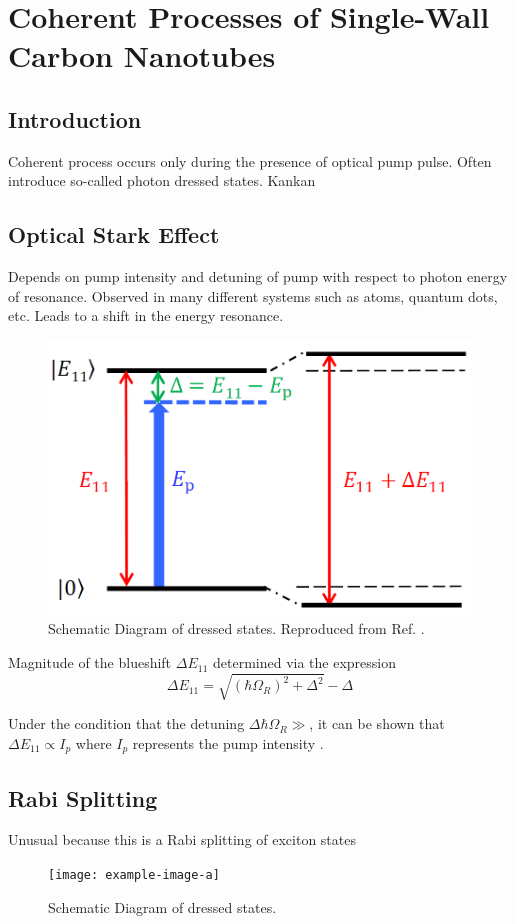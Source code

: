 \chapter{Coherent Processes of Single-Wall Carbon Nanotubes}

\section{Introduction}
Coherent process occurs only during the presence of optical pump pulse. Often introduce so-called photon dressed states. 
Kankan \cite{cong2018}

\section{Optical Stark Effect}

Depends on pump intensity and detuning of pump with respect to photon energy of resonance. Observed in many different systems such as atoms, quantum dots, etc. Leads to a shift in the energy resonance. 
\begin{figure}[H]
	\centering
	\includegraphics[scale=0.5]{images/chapter_coherent/kankan_stark_effect.png}
	\caption{Schematic Diagram of dressed states. Reproduced from Ref. \cite{cong2018}.}
\end{figure}

Magnitude of the blueshift $\Delta E_{11}$ determined via the expression
\begin{equation}
		\Delta E_{11} = \sqrt{(\hbar \Omega_R)^2 + \Delta^2} - \Delta
\end{equation}

Under the condition that the detuning $\Delta \hbar \Omega_R\gg $, it can be shown that $\Delta E_{11} \propto I_p$ where $I_p$ represents the pump intensity \cite{cong2018}. 
\section{Rabi Splitting}

Unusual because this is a Rabi splitting of exciton states \cite{cong2018}

\begin{figure}[H]
	\centering
	\texttt{[image: example-image-a]}
	\caption{Schematic Diagram of dressed states. }
\end{figure}
